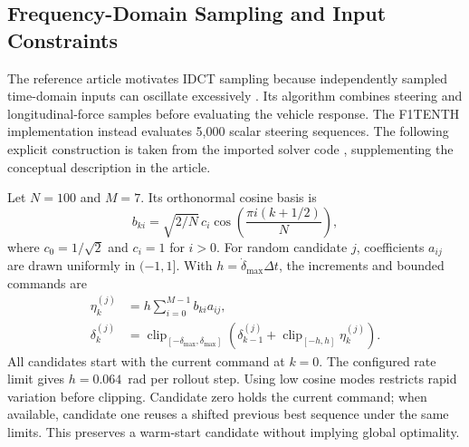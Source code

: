 \subsection{Frequency-Domain Sampling and Input Constraints}
The reference article motivates IDCT sampling because independently sampled time-domain inputs can oscillate excessively \cite{muraleedharan2025racing}. Its algorithm combines steering and longitudinal-force samples before evaluating the vehicle response. The F1TENTH implementation instead evaluates 5,000 scalar steering sequences. The following explicit construction is taken from the imported solver code \cite{muraleedharan2026solver}, supplementing the conceptual description in the article.

Let $N=100$ and $M=7$. Its orthonormal cosine basis is
\begin{equation}
 b_{ki}=\sqrt{2/N}\,c_i\cos\!\left(\frac{\pi i(k+1/2)}{N}\right),
\end{equation}
where $c_0=1/\sqrt{2}$ and $c_i=1$ for $i>0$. For random candidate $j$, coefficients $a_{ij}$ are drawn uniformly in $(-1,1]$. With $h=\dot\delta_{\max}\Delta t$, the increments and bounded commands are
\begin{equation}
\begin{aligned}
\eta_k^{(j)} &=h\sum_{i=0}^{M-1}b_{ki}a_{ij},\\
\delta_k^{(j)} &=\operatorname{clip}_{[-\delta_{\max},\delta_{\max}]}\!\left(
\delta_{k-1}^{(j)}+\operatorname{clip}_{[-h,h]}\eta_k^{(j)}\right).
\end{aligned}\label{eq:idct}
\end{equation}
All candidates start with the current command at $k=0$. The configured rate limit gives $h=0.064$~rad per rollout step. Using low cosine modes restricts rapid variation before clipping. Candidate zero holds the current command; when available, candidate one reuses a shifted previous best sequence under the same limits. This preserves a warm-start candidate without implying global optimality.

